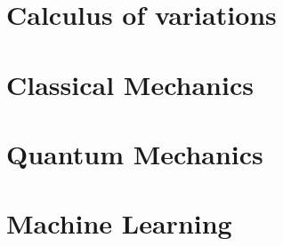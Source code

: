 \documentclass{book}
\begin{document}
\chapter{Calculus of variations}


\chapter{Classical Mechanics}







\chapter{Quantum Mechanics}


\chapter{Machine Learning}


\end{document}
